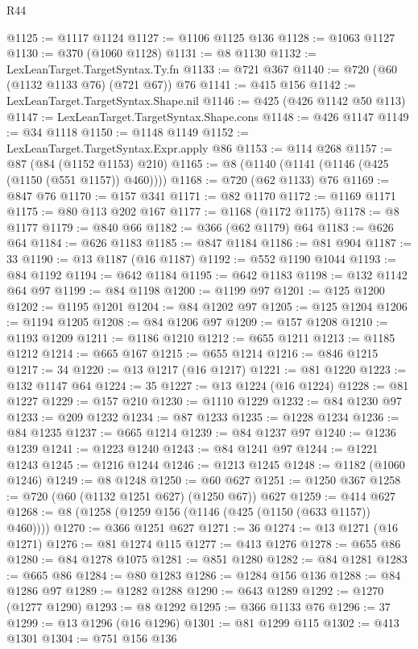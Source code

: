 \begin{lexlean}{R44}
\begin{coremodule}
@1125 := @1117 @1124
@1127 := @1106 @1125 @136
@1128 := @1063 @1127
@1130 := @370 (@1060 @1128)
@1131 := @8 @1130
@1132 := LexLeanTarget.TargetSyntax.Ty.fn
@1133 := @721 @367
@1140 := @720 (@60 (@1132 @1133 @76) (@721 @67)) @76
@1141 := @415 @156
@1142 := LexLeanTarget.TargetSyntax.Shape.nil
@1146 := @425 (@426 @1142 @50 @113)
@1147 := LexLeanTarget.TargetSyntax.Shape.cons
@1148 := @426 @1147
@1149 := @34 @1118
@1150 := @1148 @1149
@1152 := LexLeanTarget.TargetSyntax.Expr.apply @86
@1153 := @114 @268
@1157 := @87 (@84 (@1152 @1153) @210)
@1165 := @8 (@1140 (@1141 (@1146 (@425 (@1150 (@551 @1157)) @460))))
@1168 := @720 (@62 @1133) @76
@1169 := @847 @76
@1170 := @157 @341
@1171 := @82 @1170
@1172 := @1169 @1171
@1175 := @80 @113 @202 @167
@1177 := @1168 (@1172 @1175)
@1178 := @8 @1177
@1179 := @840 @66
@1182 := @366 (@62 @1179) @64
@1183 := @626 @64
@1184 := @626 @1183
@1185 := @847 @1184
@1186 := @81 @904
@1187 := 33
@1190 := @13 @1187 (@16 @1187)
@1192 := @552 @1190 @1044
@1193 := @84 @1192
@1194 := @642 @1184
@1195 := @642 @1183
@1198 := @132 @1142 @64 @97
@1199 := @84 @1198
@1200 := @1199 @97
@1201 := @125 @1200
@1202 := @1195 @1201
@1204 := @84 @1202 @97
@1205 := @125 @1204
@1206 := @1194 @1205
@1208 := @84 @1206 @97
@1209 := @157 @1208
@1210 := @1193 @1209
@1211 := @1186 @1210
@1212 := @655 @1211
@1213 := @1185 @1212
@1214 := @665 @167
@1215 := @655 @1214
@1216 := @846 @1215
@1217 := 34
@1220 := @13 @1217 (@16 @1217)
@1221 := @81 @1220
@1223 := @132 @1147 @64
@1224 := 35
@1227 := @13 @1224 (@16 @1224)
@1228 := @81 @1227
@1229 := @157 @210
@1230 := @1110 @1229
@1232 := @84 @1230 @97
@1233 := @209 @1232
@1234 := @87 @1233
@1235 := @1228 @1234
@1236 := @84 @1235
@1237 := @665 @1214
@1239 := @84 @1237 @97
@1240 := @1236 @1239
@1241 := @1223 @1240
@1243 := @84 @1241 @97
@1244 := @1221 @1243
@1245 := @1216 @1244
@1246 := @1213 @1245
@1248 := @1182 (@1060 @1246)
@1249 := @8 @1248
@1250 := @60 @627
@1251 := @1250 @367
@1258 := @720 (@60 (@1132 @1251 @627) (@1250 @67)) @627
@1259 := @414 @627
@1268 := @8 (@1258 (@1259 @156 (@1146 (@425 (@1150 (@633 @1157)) @460))))
@1270 := @366 @1251 @627
@1271 := 36
@1274 := @13 @1271 (@16 @1271)
@1276 := @81 @1274 @115
@1277 := @413 @1276
@1278 := @655 @86
@1280 := @84 @1278 @1075
@1281 := @851 @1280
@1282 := @84 @1281
@1283 := @665 @86
@1284 := @80 @1283
@1286 := @1284 @156 @136
@1288 := @84 @1286 @97
@1289 := @1282 @1288
@1290 := @643 @1289
@1292 := @1270 (@1277 @1290)
@1293 := @8 @1292
@1295 := @366 @1133 @76
@1296 := 37
@1299 := @13 @1296 (@16 @1296)
@1301 := @81 @1299 @115
@1302 := @413 @1301
@1304 := @751 @156 @136

\end{coremodule}
\end{lexlean}
